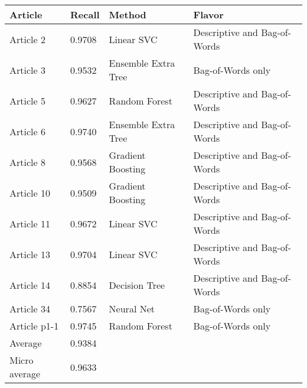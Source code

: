 \begin{tabular}{|l|l|l|l| }
\hline
Article & Recall & Method & Flavor \\ \hline
Article 2 & 0.9708 & Linear SVC & Descriptive and Bag-of-Words\\
Article 3 & 0.9532 & Ensemble Extra Tree & Bag-of-Words only\\
Article 5 & 0.9627 & Random Forest & Descriptive and Bag-of-Words\\
Article 6 & 0.9740 & Ensemble Extra Tree & Descriptive and Bag-of-Words\\
Article 8 & 0.9568 & Gradient Boosting & Descriptive and Bag-of-Words\\
Article 10 & 0.9509 & Gradient Boosting & Descriptive and Bag-of-Words\\
Article 11 & 0.9672 & Linear SVC & Descriptive and Bag-of-Words\\
Article 13 & 0.9704 & Linear SVC & Descriptive and Bag-of-Words\\
Article 14 & 0.8854 & Decision Tree & Descriptive and Bag-of-Words\\
Article 34 & 0.7567 & Neural Net & Bag-of-Words only\\
Article p1-1 & 0.9745 & Random Forest & Bag-of-Words only\\
Average & 0.9384 & & \\
Micro average & 0.9633 & & \\
\hline
\end{tabular}